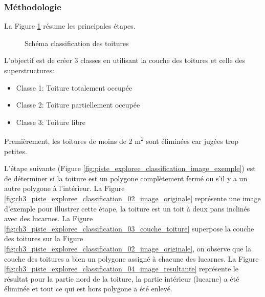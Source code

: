 \subsubsection{Méthodologie}
La Figure \ref{fig:ch3_piste_exploree_classification_01_workflow} résume les principales étapes. 

\begin{figure}[H]
    \centering
    \caption{Schéma classification des toitures}
    \label{fig:ch3_piste_exploree_classification_01_workflow}
\end{figure}

L'objectif est de créer 3 classes en utilisant la couche des toitures et celle des superstructures:
\begin{itemize}
    \item Classe 1: Toiture totalement occupée
    \item Classe 2: Toiture partiellement occupée
    \item Classe 3: Toiture libre
\end{itemize}
Premièrement, les toitures de moins de 2 \si{\unit{\square\meter}} sont éliminées car jugées trop petites.

L'étape suivante (Figure \ref{fig:piste_exploree_classification_image_exemple}) est de déterminer si la toiture est un polygone complètement fermé ou s'il y a un autre polygone à l'intérieur. La Figure \ref{fig:ch3_piste_exploree_classification_02_image_originale} représente une image d'exemple pour illustrer cette étape, la toiture est un toit à deux pans inclinés avec des lucarnes. La Figure \ref{fig:ch3_piste_exploree_classification_03_couche_toiture} superpose la couche des toitures sur la Figure \ref{fig:ch3_piste_exploree_classification_02_image_originale}, on observe que la couche des toitures a bien un polygone assigné à chacune des lucarnes. La Figure \ref{fig:ch3_piste_exploree_classification_04_image_resultante} représente le résultat pour la partie nord de la toiture, la partie intérieur (lucarne) a été éliminée et tout ce qui est hors polygone a été enlevé.

